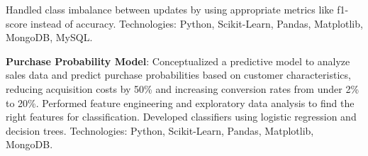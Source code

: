 \begin{cventries}
{\begin{cvitems}
{        Handled class imbalance between updates by using appropriate metrics like f1-score instead of accuracy. 
        Technologies: Python, Scikit-Learn, Pandas, Matplotlib, MongoDB, MySQL.}
        \item{\textbf{Purchase Probability Model}: Conceptualized a predictive model to analyze sales data and predict purchase probabilities based on customer characteristics, reducing acquisition costs by 50\% and increasing conversion rates from under 2\% to 20\%. \newline
        Performed feature engineering and exploratory data analysis to find the right features for classification.
        \newline Developed classifiers using logistic regression and decision trees. \newline Technologies: Python, Scikit-Learn, Pandas, Matplotlib, MongoDB.}
      \end{cvitems}
    }

\end{cventries}